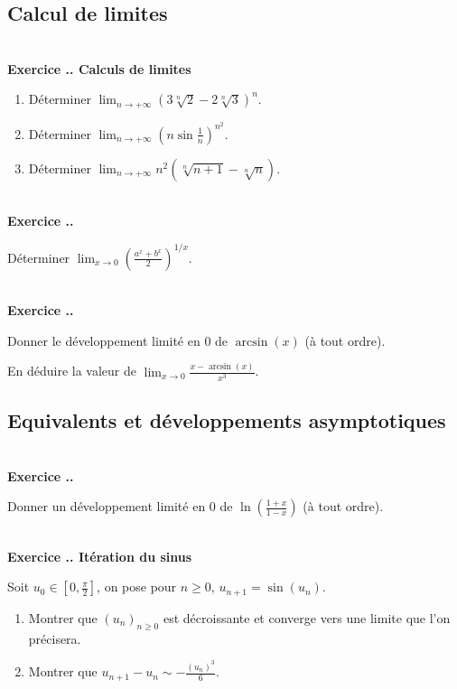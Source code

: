 \documentclass{article}
\newcounter{exo}
\newcommand{\exercice}[1][\null]{\textbf{\\ Exercice \thesection.\theexo. #1} \addtocounter{exo}{1}}
\begin{document}
\subsection{Calcul de limites}

\exercice[Calculs de limites]

\begin{enumerate}

\item Déterminer $\displaystyle \lim_{n \rightarrow + \infty} (3 \sqrt[n]{2} - 2 \sqrt[n]{3})^n$.

\item Déterminer $\displaystyle \lim_{n \rightarrow + \infty} \left(n \sin\frac{1}{n}\right)^{n^2}$.

\item Déterminer $\displaystyle \lim_{n \rightarrow + \infty} n^2\left(\sqrt[n]{n+1} - \sqrt[n]{n}\right)$.

\end{enumerate}


\exercice

Déterminer $\displaystyle \lim_{x \rightarrow 0} \left( \frac{a^x + b^x}{2}\right)^{1/x}$.

\exercice

Donner le développement limité en $0$ de $\arcsin(x)$ (à tout ordre).

En déduire la valeur de $\displaystyle \lim_{x \rightarrow 0} \frac{x - \arcsin(x)}{x^3}$.


\subsection{Equivalents et développements asymptotiques}



\exercice

Donner un développement limité en $0$ de $\ln(\frac{1+x}{1-x})$ (à tout ordre).


\exercice[Itération du sinus]

Soit $u_0 \in [0, \frac{\pi}{2}]$, on pose pour $n \ge 0$, $u_{n+1} = \sin(u_n)$.

\begin{enumerate}

\item Montrer que $(u_n)_{n \ge 0}$ est décroissante et converge vers une limite que l'on précisera.

\item Montrer que $u_{n+1} - u_n \sim - \frac{(u_n)^3}{6}$.
\end{enumerate}
\end{document}
